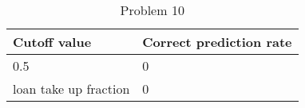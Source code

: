 \begin{table}[h!]
\caption{Problem 10}
	\label{q10}
\begin{center}
\begin{tabular}{ll}
\toprule
Cutoff value & Correct prediction rate \\
\toprule
0.5 & 0 \\
loan take up fraction  & 0 \\
\bottomrule
\end{tabular}
\end{center}
\end{table}
